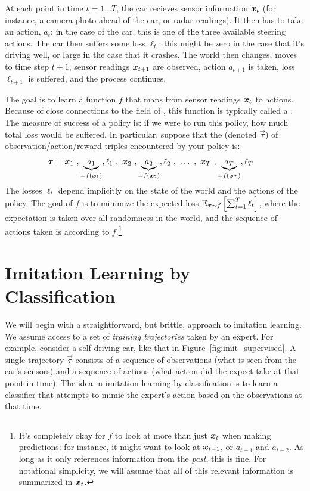 At each point in time $t = 1 \dots T$, the car recieves sensor information ${\boldsymbol{x}}_t$ (for instance, a camera photo ahead of the car, or radar readings).
It then has to take an action, $a_t$; in the case of the car, this is one of the three available steering actions.
The car then suffers some loss $\ell_t$; this might be zero in the case that it's driving well, or large in the case that it crashes.
The world then changes, moves to time step $t+1$, sensor readings ${\boldsymbol{x}}_{t+1}$ are observed, action $a_{t+1}$ is taken, loss $\ell_{t+1}$ is suffered, and the process continues.

The goal is to learn a function $f$ that maps from sensor readings ${\boldsymbol{x}}_t$ to actions.
Because of close connections to the field of , this function is typically called a .
The measure of success of a policy is: if we were to run this policy, how much total loss would be suffered.
In particular, suppose that the  (denoted $\vec\tau$) of observation/action/reward triples encountered by your policy is:
\begin{align}
  \boldsymbol{\tau} &=
  {\boldsymbol{x}}_1~, \underbrace{a_1}_{=f({\boldsymbol{x}}_1)}, \ell_1~,~
  {\boldsymbol{x}}_2~, \underbrace{a_2}_{=f({\boldsymbol{x}}_2)}, \ell_2~,~
  \dots~,~
  {\boldsymbol{x}}_T~, \underbrace{a_T}_{=f({\boldsymbol{x}}_T)}, \ell_T
\end{align}
The losses $\ell_t$ depend implicitly on the state of the world and the actions of the policy.
The goal of $f$ is to minimize the expected loss $\mathbb{E}_{\boldsymbol{\tau} \sim f}\left[ \sum_{t=1}^T \ell_t \right]$, where the expectation is taken over all randomness in the world, and the sequence of actions taken is according to $f$.\footnote{It's completely okay for $f$ to look at more than just ${\boldsymbol{x}}_t$ when making predictions; for instance, it might want to look at ${\boldsymbol{x}}_{t-1}$, or $a_{t-1}$ and $a_{t-2}$. As long as it only references information from the \emph{past}, this is fine. For notational simplicity, we will assume that all of this relevant information is summarized in ${\boldsymbol{x}}_t$.}

\section{Imitation Learning by Classification}

\newcommand{\vt}{\vec\tau}


We will begin with a straightforward, but brittle, approach to imitation learning.
We assume access to a set of \emph{training trajectories} taken by an expert.
For example, consider a self-driving car, like that in Figure~\ref{fig:imit_supervised}.
A single trajectory $\vt$ consists of a sequence of observations (what is seen from the car's sensors) and a sequence of actions (what action did the expect take at that point in time).
The idea in imitation learning by classification is to learn a classifier that attempts to mimic the expert's action based on the observations at that time.

